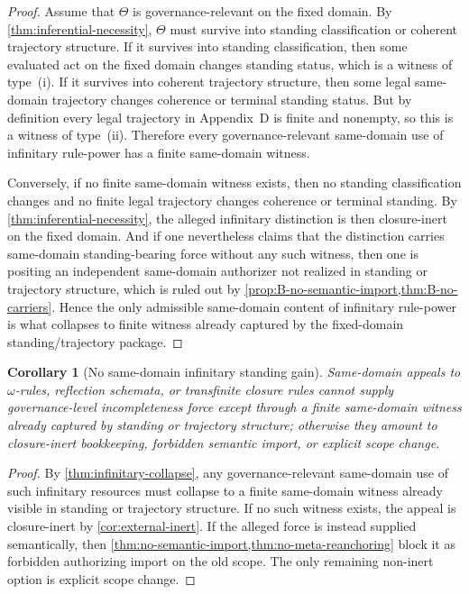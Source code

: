 \documentclass[11pt]{article}
\theoremstyle{plain}
\newtheorem{corollary}[theorem]{Corollary}
\theoremstyle{definition}
\begin{document}
\begin{proof}
Assume that $\Theta$ is governance-relevant on the fixed domain. By \cref{thm:inferential-necessity}, $\Theta$ must survive into standing classification or coherent trajectory structure. If it survives into standing classification, then some evaluated act on the fixed domain changes standing status, which is a witness of type~(i). If it survives into coherent trajectory structure, then some legal same-domain trajectory changes coherence or terminal standing status. But by definition every legal trajectory in Appendix~D is finite and nonempty, so this is a witness of type~(ii). Therefore every governance-relevant same-domain use of infinitary rule-power has a finite same-domain witness.

Conversely, if no finite same-domain witness exists, then no standing classification changes and no finite legal trajectory changes coherence or terminal standing. By \cref{thm:inferential-necessity}, the alleged infinitary distinction is then closure-inert on the fixed domain. And if one nevertheless claims that the distinction carries same-domain standing-bearing force without any such witness, then one is positing an independent same-domain authorizer not realized in standing or trajectory structure, which is ruled out by \cref{prop:B-no-semantic-import,thm:B-no-carriers}. Hence the only admissible same-domain content of infinitary rule-power is what collapses to finite witness already captured by the fixed-domain standing/trajectory package.
\end{proof}

\begin{corollary}[No same-domain infinitary standing gain]
\label{cor:no-infinitary-standing-gain}
Same-domain appeals to $\omega$-rules, reflection schemata, or transfinite closure rules cannot supply governance-level incompleteness force except through a finite same-domain witness already captured by standing or trajectory structure; otherwise they amount to closure-inert bookkeeping, forbidden semantic import, or explicit scope change.
\end{corollary}

\begin{proof}
By \cref{thm:infinitary-collapse}, any governance-relevant same-domain use of such infinitary resources must collapse to a finite same-domain witness already visible in standing or trajectory structure. If no such witness exists, the appeal is closure-inert by \cref{cor:external-inert}. If the alleged force is instead supplied semantically, then \cref{thm:no-semantic-import,thm:no-meta-reanchoring} block it as forbidden authorizing import on the old scope. The only remaining non-inert option is explicit scope change.
\end{proof}
\end{document}
